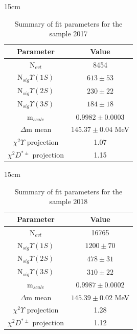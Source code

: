 \begin{table}[!htbp]{15cm}
  \caption{Summary of fit parameters for the sample 2017}\label{tab:fit_summary_2017}
  \begin{tabular}{ c | c }
    Parameter & Value \\ 
    \hline
    N$_{evt}$                    & 8454 \\ \hline
    N$_{sig} \Upsilon(1S)$       & $613 \pm 53$ \\ \hline
    N$_{sig} \Upsilon(2S)$       & $230 \pm 22$ \\ \hline
    N$_{sig} \Upsilon(3S)$       & $184 \pm 18$ \\ \hline
    m$_{scale}$                  & $0.9982 \pm 0.0003$ \\ \hline
    $\Delta$m mean               & $145.37 \pm 0.04$ MeV \\ \hline
    $\chi^2 \Upsilon$ projection & 1.07 \\ \hline
    $\chi^2 D^{*\pm}$ projection & 1.15 \\ \hline
  \end{tabular}
\end{table}

\begin{table}[!htbp]{15cm}
  \caption{Summary of fit parameters for the sample 2018}\label{tab:fit_summary_2018}
  \begin{tabular}{ c | c }
    Parameter & Value \\ 
    \hline 
    N$_{evt}$                    & 16765 \\ \hline
    N$_{sig} \Upsilon(1S)$       & $1200 \pm 70$ \\ \hline
    N$_{sig} \Upsilon(2S)$       & $478 \pm 31$ \\ \hline
    N$_{sig} \Upsilon(3S)$       & $310 \pm 22$ \\ \hline
    m$_{scale}$                  & $0.9987 \pm 0.0002$ \\ \hline
    $\Delta$m mean               & $145.39 \pm 0.02$ MeV \\ \hline
    $\chi^2 \Upsilon$ projection & 1.28 \\ \hline
    $\chi^2 D^{*\pm}$ projection & 1.12 \\ \hline
  \end{tabular}
\end{table}

